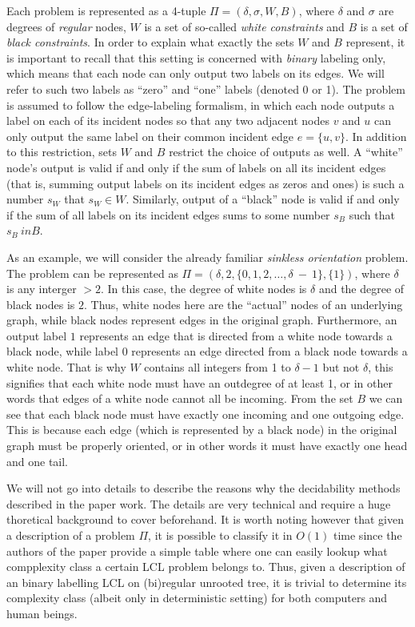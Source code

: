Each problem is represented as a 4-tuple $\Pi = (\delta, \sigma, W, B)$, where
$\delta$ and $\sigma$ are degrees of \emph{regular} nodes, $W$ is a set of so-called
\emph{white constraints} and $B$ is a set of \emph{black constraints}. In order to
explain what exactly the sets $W$ and $B$ represent, it is important to recall that
this setting is concerned with \emph{binary} labeling only, which means that each node
can only output two labels on its edges. We will refer to such two labels as ``zero'' and ``one''
labels (denoted 0 or 1). The problem is assumed to follow the edge-labeling
formalism, in which each node outputs a label on each of its incident nodes so that
any two adjacent nodes $v$ and $u$ can only output the same label on their common
incident edge $e = \{u, v\}$. In addition to this restriction, sets $W$ and $B$
restrict the choice of outputs as well. A ``white'' node's output is valid
if and only if the sum of labels on all its incident edges (that is, summing
output labels on its incident edges as zeros and ones) is such a number $s_W$ that
$s_W \in W$. Similarly, output of a ``black'' node is valid if and only if
the sum of all labels on its incident edges sums to some number $s_B$ such that
$s_B \ in B$.

As an example, we will consider the already familiar \emph{sinkless orientation}
problem. The problem can be represented as $\Pi = (\delta, 2, \{0, 1, 2, \dots, \delta~-~1\}, \{ 1 \})$,
where $\delta$ is any interger $> 2$. In this case, the degree of white nodes is
$\delta$ and the degree of black nodes is $2$. Thus, white nodes here are the ``actual''
nodes of an underlying graph, while black nodes represent edges in the original graph.
Furthermore, an output label $1$ represents an edge
that is directed from a white node towards a black node, while label $0$ represents
an edge directed from a black node towards a white node. That is why
$W$ contains all integers from 1 to $\delta - 1$ but not $\delta$,
this signifies that each white node must have an outdegree of at least 1,
or in other words that edges of a white node cannot all be incoming.
From the set $B$ we can see that each black node must have 
exactly one incoming and one outgoing edge. This is because each edge (which is represented by a black node)
in the original graph must be properly oriented, or in other words it must
have exactly one head and one tail.

We will not go into details to describe the reasons why the decidability methods
described in the paper work. The details are very technical and require a huge
thoretical background to cover beforehand. It is worth noting however that
given a description of a problem $\Pi$, it is possible to classify it in $O(1)$
time since the authors of the paper provide a simple table where one can
easily lookup what compplexity class a certain LCL problem belongs to. Thus,
given a description of an binary labelling LCL on (bi)regular unrooted tree,
it is trivial to determine its complexity class (albeit only in deterministic setting)
for both computers and human beings.


